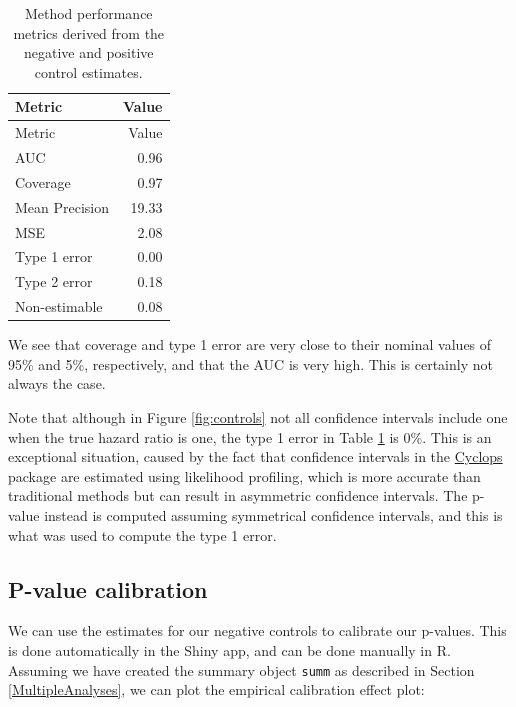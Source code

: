 \documentclass[11pt]{book}
\theoremstyle{definition}
\theoremstyle{definition}
\theoremstyle{definition}
\theoremstyle{remark}
\begin{document}
\begin{longtable}[]{@{}lr@{}}
\caption{\label{tab:exampleMetrics} Method performance metrics derived from the negative and positive control estimates.}\tabularnewline
\toprule
Metric & Value\tabularnewline
\midrule
\endfirsthead
\toprule
Metric & Value\tabularnewline
\midrule
\endhead
AUC & 0.96\tabularnewline
Coverage & 0.97\tabularnewline
Mean Precision & 19.33\tabularnewline
MSE & 2.08\tabularnewline
Type 1 error & 0.00\tabularnewline
Type 2 error & 0.18\tabularnewline
Non-estimable & 0.08\tabularnewline
\bottomrule
\end{longtable}

We see that coverage and type 1 error are very close to their nominal values of 95\% and 5\%, respectively, and that the AUC is very high. This is certainly not always the case.

Note that although in Figure \ref{fig:controls} not all confidence intervals include one when the true hazard ratio is one, the type 1 error in Table \ref{tab:exampleMetrics} is 0\%. This is an exceptional situation, caused by the fact that confidence intervals in the \href{https://ohdsi.github.io/Cyclops/}{Cyclops} package are estimated using likelihood profiling, which is more accurate than traditional methods but can result in asymmetric confidence intervals. The p-value instead is computed assuming symmetrical confidence intervals, and this is what was used to compute the type 1 error.

\hypertarget{p-value-calibration-1}{%
\subsection{P-value calibration}\label{p-value-calibration-1}}

We can use the estimates for our negative controls to calibrate our p-values. This is done automatically in the Shiny app, and can be done manually in R. Assuming we have created the summary object \texttt{summ} as described in Section \ref{MultipleAnalyses}, we can plot the empirical calibration effect plot:
\end{document}
